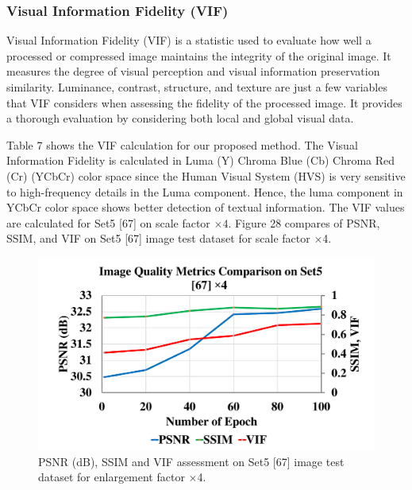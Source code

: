 \documentclass{ieeeaccess}
\begin{document}
\subsubsection{Visual Information Fidelity (VIF)}

Visual Information Fidelity (VIF) is a statistic used to evaluate how well a processed or compressed image maintains the integrity of the original image. It measures the degree of visual perception and visual information preservation similarity. Luminance, contrast, structure, and texture are just a few variables that VIF considers when assessing the fidelity of the processed image. It provides a thorough evaluation by considering both local and global visual data.

Table 7 shows the VIF calculation for our proposed method. The Visual Information Fidelity is calculated in Luma (Y) Chroma Blue (Cb) Chroma Red (Cr) (YCbCr) color space since the Human Visual System (HVS) is very sensitive to high-frequency details in the Luma component. Hence, the luma component in YCbCr color space shows better detection of textual information. The VIF values are calculated for Set5 [67] on scale factor $\times4$. Figure 28 compares of PSNR, SSIM, and VIF on Set5 [67] image test dataset for scale factor $\times$4.

\begin{figure}
  \includegraphics[width=\linewidth]{28FIGURE.pdf}
  \caption{PSNR (dB), SSIM and VIF assessment on Set5 [67] image test dataset for enlargement factor $\times$4.}
  \label{fig:28}
\end{figure}
\end{document}
